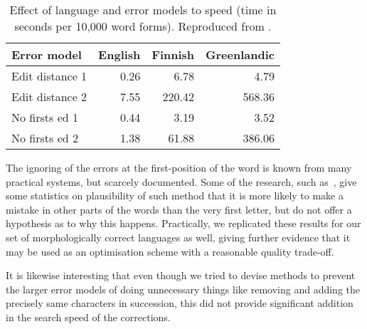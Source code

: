 \documentclass[officiallayout]{unihelcompling}
\begin{document}
\begin{table}
    \centering
\begin{tabular}{|l|rrr|} \hline \bf Error model & \bf English & \bf Finnish &
    \bf Greenlandic \\ \hline Edit distance 1 & 0.26&6.78&4.79 \\ Edit distance
    2 & 7.55&220.42&568.36 \\
No firsts ed 1 & 0.44&3.19&3.52 \\ No firsts ed 2 & 1.38&61.88&386.06 \\
\hline \end{tabular}

    \caption{Effect of language and error models to speed (time in seconds per 
        10,000 word forms). Reproduced from .
    \label{table:fsmnlp-2012-repro}}
\end{table}

The ignoring of the errors at the first-position of the word is known from many
practical systems, but scarcely documented. Some of the research, such
as~\citet{bhagat2007spelling}, give some statistics on plausibility of such
method that it is more likely to make a mistake in other parts of the words
than the very first letter, but do not offer a hypothesis as to why this
happens.  Practically, we replicated these results for our set of
morphologically correct languages as well, giving further evidence that it may
be used as an optimisation scheme with a reasonable quality trade-off.

It is likewise interesting that even though we tried to devise methods to
prevent the larger error models of doing unnecessary things like removing and
adding the precisely same characters in succession, this did not provide
significant addition in the search speed of the corrections.
\end{document}
